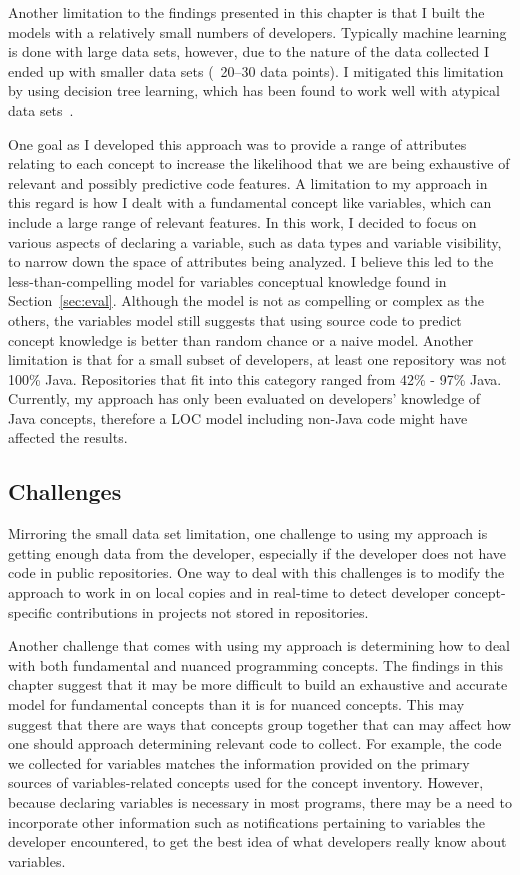 Another limitation to the findings presented in this chapter is that I built the models with a relatively small numbers of developers. Typically machine learning is done with large data sets, however, due to the nature of the data collected I ended up with smaller data sets (~20--30 data points). I mitigated this limitation by using decision tree learning, which has been found to work well with atypical data sets~\cite{zhang2005missing,kotsiantis2007supervised}.

One goal as I developed this approach was to provide a range of attributes relating to each concept to increase the likelihood that we are being exhaustive of relevant and possibly predictive code features. A limitation to my approach in this regard is how I dealt with a fundamental concept like variables, which can include a large range of relevant features. In this work, I decided to focus on various aspects of declaring a variable, such as data types and variable visibility, to narrow down the space of attributes being analyzed. I believe this led to the less-than-compelling model for variables conceptual knowledge found in Section~\ref{sec:eval}. Although the model is not as compelling or complex as the others, the variables model still suggests that using source code to predict concept knowledge is better than random chance or a naive model.
Another limitation is that for a small subset of developers, at least one repository was not 100\% Java. Repositories that fit into this category ranged from 42\% - 97\% Java.
Currently, my approach has only been evaluated on developers' knowledge of Java concepts, therefore a LOC model including non-Java code might have affected the results. 

\subsection{Challenges}
Mirroring the small data set limitation, one challenge to using my approach is getting enough data from the developer, especially if the developer does not have code in public repositories. One way to deal with this challenges is to modify the approach to work in on local copies and in real-time to detect developer concept-specific contributions in projects not stored in repositories.

Another challenge that comes with using my approach is determining how to deal with both fundamental and nuanced programming concepts. The findings in this chapter suggest that it may be more difficult to build an exhaustive and accurate model for fundamental concepts than it is for nuanced concepts. This may suggest that there are ways that concepts group together that can may affect how one should approach determining relevant code to collect. For example, the code we collected for variables matches the information provided on the primary sources of variables-related concepts used for the concept inventory. However, because declaring variables is necessary in most programs, there may be a need to incorporate other information such as notifications pertaining to variables the developer encountered, to get the best idea of what developers really know about variables.

